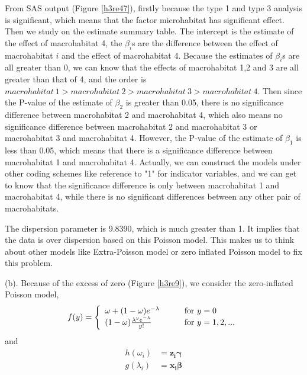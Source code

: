 \documentclass[letterpaper, 12pt]{article}
\newcommand{\ba}{$$\begin{aligned}}
\newcommand{\ea}{\end{aligned}$$}
\begin{document}
From SAS output (Figure \ref{h3re47}), firstly because the type 1 and type 3 analysis is significant, which means that the factor microhabitat has significant effect. Then we study on the estimate summary table. The intercept is the estimate of the effect of macrohabitat 4, the $\beta_i$s are the difference between the effect of macrohabitat $i$ and the effect of macrohabitat 4. Because the estimates of $\beta_i$s are all greater than 0, we can know that the effects of macrohabitat 1,2 and 3 are all greater than that of 4, and the order is $macrohabitat ~1>macrohabitat ~2>macrohabitat ~3>macrohabitat ~4$. Then since the P-value of the estimate of $\beta_2$ is greater than 0.05, there is no significance difference between macrohabitat 2 and macrohabitat 4, which also means no significance difference between macrohabitat 2 and macrohabitat 3 or macrohabitat 3 and macrohabitat 4. However, the P-value of the estimate of $\beta_1$ is less than 0.05, which means that there is a significance difference between macrohabitat 1 and macrohabitat 4. Actually, we can construct the models under other coding schemes like reference to "1" for indicator variables, and we can get to know that the significance difference is only between macrohabitat 1 and macrohabitat 4, while there is no significant differences between any other pair of macrohabitats.

The dispersion parameter is 9.8390, which is much greater than 1. It implies that the data is over dispersion based on this Poisson model. This makes us to think about other models like Extra-Poisson model or zero inflated Poisson model to fix this problem.


(b). Because of the excess of zero (Figure \ref{h3re9}), we consider the zero-inflated Poisson model,
$$
f(y)=\left\{\begin{array}{l l}\omega+(1-\omega)e^{-\lambda}\qquad &\text{for }y=0\\
(1-\omega)\frac{\lambda^ye^{-\lambda}}{y!}\qquad &\text{for }y=1,2,...
\end{array}\right.
$$
and
\ba
h(\omega_i)&=\bm{z_i}\bm{\gamma}\\
g(\lambda_i)&=\bm{x_i}\bm{\beta}
\ea
\end{document}
